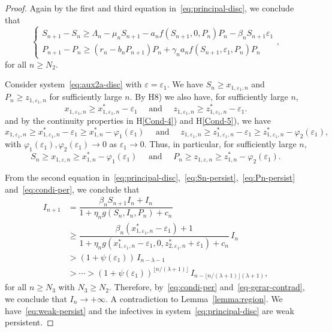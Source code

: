 \documentclass[reqno]{amsart}
\renewcommand{\phi}{\varphi}
\renewcommand{\ge}{\geqslant}
\newcommand{\eps}{\varepsilon}
\begin{document}
{{\begin{proof}
Again by the first and third equation in~\eqref{eq:principal-disc}, we conclude that
\[
\begin{cases}
S_{n+1}-S_n\ge\Lambda_n-\mu_nS_{n+1}-a_n{f(S_{n+1},0,P_n)P_n}-\beta_n S_{n+1}\eps_1\\
P_{n+1}-P_n\ge(r_n-b_nP_{n+1})P_n+\gamma_na_n{f(S_{n+1},\eps_1,P_n)P_n}
\end{cases},
\]
for all $n \ge N_2$.

Consider system~\eqref{eq:aux2a-disc} with $\eps=\eps_1$. We have $S_n \ge x_{1,\eps_1,n}$ and $P_n \ge z_{1,\eps_1,n}$ for sufficiently large $n$. By {H8)}  we also have, for sufficiently large $n$,
\[
x_{1,\eps_1,n} \ge x_{1,\eps_1,n}^*-\eps_1 \quad \text{ and } \quad z_{1,\eps_1,n} \ge z_{1,\eps_1,n}^*-\eps_1.
\]
and by the continuity properties in H\ref{Cond-4}) and H\ref{Cond-5}), we have
\[
x_{1,\eps_1,n} \ge x_{1,\eps_1,n}^*-\eps_1 \ge x_{1,n}^*-\phi_1(\eps_1) \quad \text{ and } \quad z_{1,\eps_1,n} \ge z_{1,\eps_1,n}^*-\eps_1 \ge
z_{1,\eps_1,n}^*- \phi_2(\eps_1),
\]
with $\phi_1(\eps_1),\phi_2(\eps_1) \to 0$ as $\eps_1\to 0$.
Thus, in particular, for sufficiently large $n$,
\begin{equation}\label{eq:Sn-persist}
    S_n \ge x_{1,\eps,n} \ge x_{1,n}^*-\phi_1(\eps_1) \quad \text{ and } \quad P_n \ge z_{1,\eps,n} \ge z_{1,n}^*-\phi_2(\eps_1).
\end{equation}

From the second equation in~\eqref{eq:principal-disc},~\eqref{eq:Sn-persist},~\eqref{eq:Pn-persist} and~\eqref{eq:condi-per}, we conclude that
\begin{equation}\label{eq-gerar-contrad}
\begin{split}
I_{n+1}
& =\dfrac{\beta_nS_{n+1}I_n+I_n}{1+\eta_ng(S_n,I_n,P_n)+c_n}\\
&\ge \dfrac{\beta_n( x_{1,\eps_1,n}^*-\eps_1)+1}{1+\eta_ng( x_{1,\eps_1,n}^*-\eps_1,0,z_{2,\eps_1,n}^*+\eps_1)+c_n}\, I_n\\
& >(1+\psi(\eps_1))\,I_{n-\lambda-1}\\
&>\cdots>(1+\psi(\eps_1))^{\lfloor n/(\lambda+1)\rfloor} \, I_{n-\lfloor n/(\lambda+1)\rfloor(\lambda+1)},
\end{split}
\end{equation}
for all $n\ge N_3$ with $N_3 \ge N_2$. Therefore, by~\eqref{eq:condi-per} and~\eqref{eq-gerar-contrad}, we conclude that $I_n \to +\infty$. A contradiction to Lemma~\ref{lemma:region}. We have~\eqref{eq:weak-persist} and the infectives in system~\eqref{eq:principal-disc} are weak persistent.


\end{proof}}}
\end{document}
